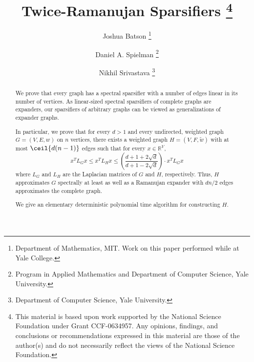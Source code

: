 \documentclass[12pt]{article}
\newcommand{\R}{\mathbb{R}}
\begin{document}
\title{Twice-Ramanujan Sparsifiers
\thanks{
This material is based upon work supported by the National Science Foundation under Grant CCF-0634957.
Any opinions, findings, and conclusions or recommendations expressed in this material are those of the author(s) and do not necessarily reflect the views of the National Science Foundation.
}\\} 
 
\author{
Joshua Batson
\thanks{
Department of Mathematics, MIT. Work on this paper performed while at
Yale College.}\\
\and
Daniel A. Spielman
\thanks{
Program in Applied Mathematics and 
Department of Computer Science,
Yale University.}\\
\and
Nikhil Srivastava
\thanks{
Department of Computer Science,
Yale University.}
}

\maketitle
\begin{abstract}
We prove that every graph has a spectral sparsifier with a number
  of edges linear in its number of vertices.
As linear-sized spectral sparsifiers of complete graphs are expanders,
  our sparsifiers of arbitrary graphs 
  can be viewed as generalizations of
  expander graphs.

In particular, we prove that for every $d > 1$ and every
  undirected, weighted graph $G = (V,E,w)$ on $n$ vertices, there exists
  a weighted graph $H=(V,F,\tilde{w})$ with at most $\ceil{d(n-1)} $ edges
  such that for every $x \in \R^{V}$,
\[
 x^T L_G x \leq 
        x^{T} L_{H} x
    \leq
\left(\frac{d+1+2\sqrt{d}}{d+1-2\sqrt{d}}\right)
      \cdot
      x^{T} L_{G} x
\]
where $L_{G}$ and $L_{H}$ are the Laplacian matrices of $G$
  and $H$, respectively. 
Thus, $H$
  approximates $G$ spectrally at least as well as a Ramanujan expander
  with $dn/2$ edges approximates the complete graph.

We give an elementary deterministic polynomial time algorithm for
  constructing $H$.
\end{abstract}
\end{document}
